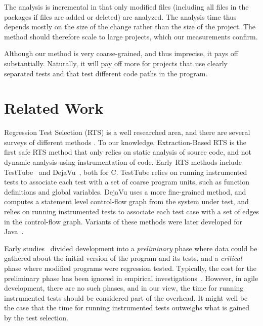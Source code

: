 {The \ourtool{} analysis is incremental in that only modified files (including all files in the packages if files are added or deleted) are analyzed. The analysis time thus depends mostly on the size of the change rather than the size of the project. The method should therefore scale to large projects, which our measurements confirm.

Although our method is very coarse-grained, and thus imprecise, it pays off
substantially. Naturally, it will pay off more for projects that use clearly separated tests and that test different code paths in the program.

\section{Related Work}
\label{RelatedWork}

Regression Test Selection (RTS) is a well researched area, and there are several surveys of
different methods \cite{rothermel1996analyzing, biswas2011regression, yoo2012regression}. To our
knowledge, Extraction-Based RTS is the first safe RTS method that only relies on static analysis of
source code, and not dynamic analysis using instrumentation of code. Early RTS methods include TestTube~\cite{chen1994testtube} and DejaVu~\cite{rothermel1997safe}, both for C. TestTube relies on running instrumented tests to associate each test with a set of coarse program units, such as function definitions and global variables. DejaVu uses a more fine-grained method, and computes a statement level control-flow graph from the system under test, and relies on running instrumented tests to associate each test case with a set of edges in the control-flow graph. Variants of these methods were later developed for Java~\cite{orso2004scaling, skoglund2007improving}.

Early studies~\cite{rothermel1997safe,bible2001comparative} divided development into a \emph{preliminary} phase where data could be gathered about the initial version of the program and its tests, and a \emph{critical} phase where modified programs were regression tested. Typically, the cost for the preliminary phase has been ignored in empirical investigations~\cite{rothermel1997safe, bible2001comparative,orso2004scaling, skoglund2007improving}. However, in agile development, there are no such phases, and in our view, the time for running instrumented tests should be considered part of the overhead. It might well be the case that the time for running instrumented tests outweighs what is gained by the test selection.

}
